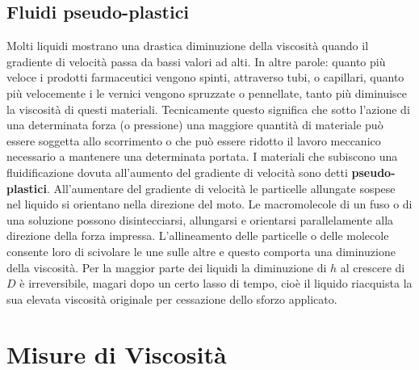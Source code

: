 \section{Fluidi pseudo-plastici}
Molti liquidi mostrano una drastica diminuzione della viscosità quando il gradiente di velocità passa da bassi valori ad alti. In altre parole: quanto più veloce i prodotti farmaceutici vengono spinti, attraverso tubi, o capillari, quanto più velocemente i le vernici vengono spruzzate o pennellate, tanto più diminuisce la viscosità di questi materiali.
Tecnicamente questo significa che sotto l'azione di una determinata forza (o pressione) una maggiore quantità di materiale può essere soggetta allo scorrimento o che può essere ridotto il lavoro meccanico necessario a mantenere una determinata portata.
I materiali che subiscono una fluidificazione dovuta all'aumento del gradiente di velocità sono detti \textbf{pseudo-plastici}.
All'aumentare del gradiente di velocità le particelle allungate sospese nel liquido si orientano nella direzione del moto. Le macromolecole di un fuso o di una soluzione possono disintecciarsi, allungarsi e orientarsi parallelamente alla direzione della forza impressa. L'allineamento delle particelle o delle molecole consente loro di scivolare le une sulle altre e questo comporta una diminuzione della viscosità.
Per la maggior parte dei liquidi la diminuzione di $h$ al crescere di $D$ è irreversibile, magari dopo un certo lasso di tempo, cioè il liquido riacquista la sua elevata viscosità originale per cessazione dello sforzo applicato.


\chapter{Misure di Viscosità}\label{chp:MisureViscosità}
